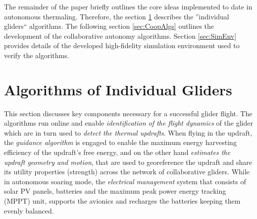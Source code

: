 \documentclass{ifacconf}
\newcommand{\squeezeup}{\vspace{-2.0mm}}
\begin{document}
The remainder of the paper briefly outlines the core ideas implemented to
date in autonomous thermaling. Therefore, the section \ref{sec:IndAlgs}
describes the ''individual gliders`` algorithms. The following section
\ref{sec:CoopAlgs} outlines the development of the collaborative autonomy
algorithms. Section \ref{sec:SimEnv} provides details of the developed
high-fidelity simulation environment used to verify the algorithms.


\section{ Algorithms of Individual Gliders}
\label{sec:IndAlgs}
\squeezeup

This section discusses key components necessary for a successful glider
flight. The algorithms run online and enable \emph{identification of the
flight dynamics} of the glider which are in turn used to \emph{detect the
thermal updrafts}. When flying in the updraft, the \emph{guidance algorithm}
is engaged to enable the maximum energy harvesting efficiency of the
updraft's free energy, and on the other hand \emph{estimates the updraft
geometry and motion}, that are used to georeference the updraft and share its
utility properties (strength) across the network of collaborative gliders.
%
%
While in autonomous soaring mode, the \emph{electrical management} system
that consists of solar PV panels, batteries and the maximum peak power energy
tracking (MPPT) unit, supports the avionics and recharges the batteries
keeping them evenly balanced.

%
\end{document}

